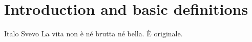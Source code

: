 \documentclass[../main/main.tex]{subfiles}
\begin{document}
\chapter{Introduction and basic definitions}

\begin{chapquote}{Italo Svevo}
    La vita non è né brutta né bella. È originale.
\end{chapquote}

\end{document}
